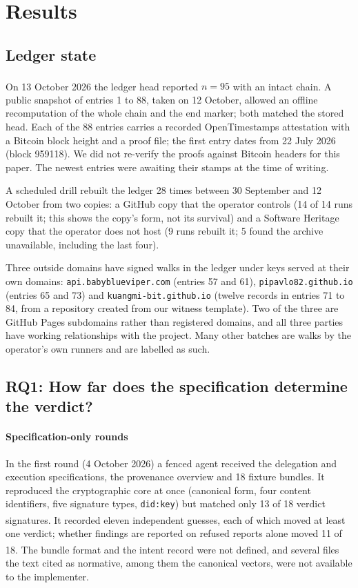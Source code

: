 \documentclass[preprint,12pt,authoryear]{elsarticle}
\newcommand{\code}[1]{\texttt{#1}}
\newcommand{\priv}{\textsuperscript{\textdagger}}
\begin{document}
\section{Results}\label{sec:results}

\subsection{Ledger state}\label{sec:ledger}

On 13 October 2026 the ledger head reported $n=95$ with an intact chain\priv. A public snapshot of entries 1 to 88, taken on 12 October, allowed an offline recomputation of the whole chain and the end marker; both matched the stored head. Each of the 88 entries carries a recorded OpenTimestamps attestation with a Bitcoin block height and a proof file; the first entry dates from 22 July 2026 (block 959118). We did not re-verify the proofs against Bitcoin headers for this paper. The newest entries were awaiting their stamps at the time of writing.

A scheduled drill rebuilt the ledger 28 times between 30 September and 12 October from two copies: a GitHub copy that the operator controls (14 of 14 runs rebuilt it; this shows the copy's form, not its survival) and a Software Heritage copy that the operator does not host (9 runs rebuilt it; 5 found the archive unavailable, including the last four).

Three outside domains have signed walks in the ledger under keys served at their own domains: \code{api.babyblueviper.com} (entries 57 and 61), \code{pipavlo82.github.io} (entries 65 and 73) and \code{kuangmi-bit.github.io} (twelve records in entries 71 to 84, from a repository created from our witness template). Two of the three are GitHub Pages subdomains rather than registered domains, and all three parties have working relationships with the project. Many other batches are walks by the operator's own runners and are labelled as such.

\subsection{RQ1: How far does the specification determine the verdict?}\label{sec:rq1}

\paragraph{Specification-only rounds} In the first round (4 October 2026) a fenced agent received the delegation and execution specifications, the provenance overview and 18 fixture bundles. It reproduced the cryptographic core at once (canonical form, four content identifiers, five signature types, \code{did:key}) but matched only 13 of 18 verdict signatures\priv. It recorded eleven independent guesses, each of which moved at least one verdict; whether findings are reported on refused reports alone moved 11 of 18\priv. The bundle format and the intent record were not defined, and several files the text cited as normative, among them the canonical vectors, were not available to the implementer.
\end{document}
